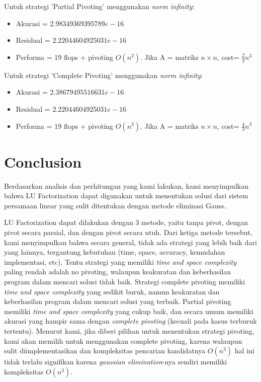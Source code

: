 \documentclass[11pt]{article}
\begin{document}
\vspace{3mm}
Untuk strategi 'Partial Pivoting' menggunakan \textit{norm infinity}:
\begin{itemize}
    \item Akurasi = $2.98349369395789e-16$
    \item Residual = $2.22044604925031e-16$
    \item Performa = 19 flops + pivoting $O(n^2)$. Jika A = matriks $n \times n$, cost= $\frac{2}{3} n^3$ 

\end{itemize}

\vspace{3mm}
Untuk strategi 'Complete Pivoting' menggunakan \textit{norm infinity}:
\begin{itemize}
    \item Akurasi =  $2.38679495516631e-16$
    \item Residual = $2.22044604925031e-16$
    \item Performa = 19 flops + pivoting $O(n^3)$. Jika A = matriks $n \times n$, cost= $\frac{4}{3} n^3$ 
\end{itemize}



\section{Conclusion}
Berdasarkan analisis dan perhitungan yang kami lakukan, kami menyimpulkan bahwa LU Factorization dapat digunakan untuk menentukan solusi dari sistem persamaan linear yang sulit ditentukan dengan metode eliminasi Gauss.

LU Factorization dapat dilakukan dengan 3 metode, yaitu tanpa pivot, dengan pivot secara parsial, dan dengan pivot secara utuh. Dari ketiga metode tersebut, kami menyimpulkan bahwa secara general, tidak ada strategi yang lebih baik dari yang lainnya, tergantung kebutuhan (time, space, accuracy, kemudahan implementasi, etc). Tentu strategi yang memiliki \textit{time and space complexity} paling rendah adalah no pivoting, walaupun keakuratan dan keberhasilan program dalam mencari solusi tidak baik. Strategi complete pivoting memiliki \textit{time and space complexity} yang sedikit buruk, namun keakuratan dan keberhasilan program dalam mencari solusi yang terbaik. Partial pivoting memiliki \textit{time and space complexity} yang cukup baik, dan secara umum memiliki akurasi yang hampir sama dengan \textit{complete pivoting} (kecuali pada kasus terburuk tertentu). Menurut kami, jika diberi pilihan untuk menentukan strategi pivoting, kami akan memilih untuk menggunakan complete pivoting, karena walaupun sulit diimplementasikan dan kompleksitas pencarian kandidatnya $O(n^3)$ hal ini tidak terlalu signifikan karena \textit{gaussian elimination}-nya sendiri memiliki kompleksitas $O(n^3)$. 
\end{document}
